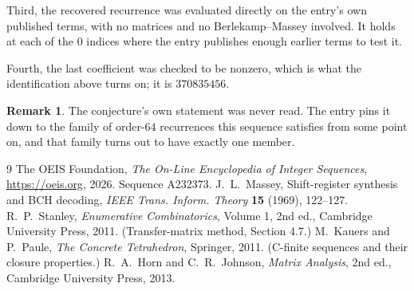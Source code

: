\documentclass[11pt,a4paper]{article}
\theoremstyle{plain}
\theoremstyle{definition}
\newtheorem{remark}[theorem]{Remark}
\begin{document}
Third, the recovered recurrence was evaluated directly on the entry's own published terms, with
no matrices and no Berlekamp--Massey involved. It holds at each of the $0$ indices where
the entry publishes enough earlier terms to test it.

Fourth, the last coefficient was checked to be nonzero, which is what the identification above
turns on; it is $370835456$.

\begin{remark}
The conjecture's own statement was never read. The entry pins it down to the family of
order-$64$ recurrences this sequence satisfies from some point on, and that family turns
out to have exactly one member.
\end{remark}

\begin{thebibliography}{9}
 The OEIS Foundation, \emph{The On-Line Encyclopedia of Integer
Sequences}, \url{https://oeis.org}, 2026. Sequence A232373.
 J.~L.~Massey, Shift-register synthesis and BCH decoding, \emph{IEEE
Trans. Inform. Theory} \textbf{15} (1969), 122--127.
 R.~P.~Stanley, \emph{Enumerative Combinatorics}, Volume 1, 2nd ed.,
Cambridge University Press, 2011. (Transfer-matrix method, Section 4.7.)
 M.~Kauers and P.~Paule, \emph{The Concrete Tetrahedron}, Springer, 2011.
(C-finite sequences and their closure properties.)
 R.~A.~Horn and C.~R.~Johnson, \emph{Matrix Analysis}, 2nd ed., Cambridge
University Press, 2013.
\end{thebibliography}
\end{document}
